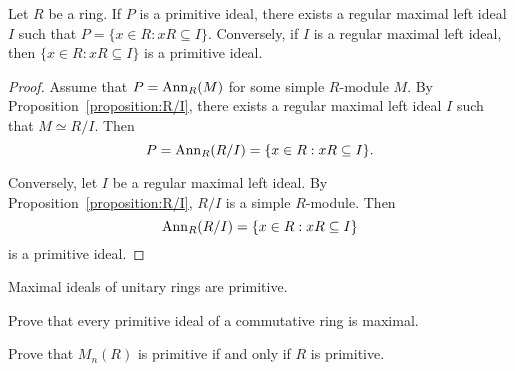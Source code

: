\begin{lemma}
	\label{lemma:maxprim}
	Let $R$ be a ring. If $P$ is a primitive ideal, there exists a regular 
        maximal left ideal $I$ such that $P=\{x\in R:xR\subseteq I\}$.
	Conversely, if $I$ is a regular maximal left ideal, then 
	$\{x\in R:xR\subseteq I\}$ is a primitive ideal. 
\end{lemma}

\begin{proof}
	Assume that $P=\operatorname{Ann}_R(M)$ for some simple $R$-module $M$. By
	Proposition~\ref{proposition:R/I}, there exists a regular maximal 
	left ideal 
	$I$ such that $M\simeq R/I$. Then 
    \[
    P=\operatorname{Ann}_R(R/I)=\{x\in
	R:xR\subseteq I\}.
    \]

	Conversely, let $I$ be a regular maximal left ideal. By
	Proposition~\ref{proposition:R/I}, $R/I$ is a simple $R$-module. Then
	\[
	\operatorname{Ann}_R(R/I)=\{x\in R:xR\subseteq I\}
	\]
	is a primitive ideal.
\end{proof}


\begin{exercise}
\label{xca:maximal=>primitive}
    Maximal ideals of unitary rings are primitive.  
\end{exercise}

\begin{exercise}
\label{xca:primitive=>maximal}
	Prove that every primitive ideal of a commutative ring is maximal.
\end{exercise}

\begin{bonus}
\label{xca:M_n(R)primitive}
    Prove that $M_n(R)$ is primitive if and only if $R$ is primitive.
\end{bonus}

